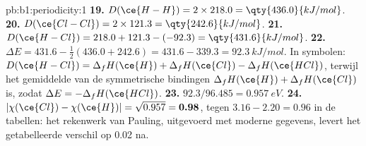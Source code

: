 \begin{solution}{pb:b1:periodicity:1}
\textbf{19.} $D(\ce{H-H}) = 2 \times 218.0 = \qty{436.0}{kJ/mol}$.
\textbf{20.} $D(\ce{Cl-Cl}) = 2 \times 121.3 = \qty{242.6}{kJ/mol}$.
\textbf{21.} $D(\ce{H-Cl}) = 218.0 + 121.3 - (-92.3) = \qty{431.6}{kJ/mol}$.
\textbf{22.} $\Delta E = 431.6 - \tfrac12(436.0 + 242.6) = 431.6 - 339.3 =
\qty{92.3}{kJ/mol}$. In symbolen: $D(\ce{H-Cl}) = \Delta_fH(\ce{H}) +
\Delta_fH(\ce{Cl}) - \Delta_fH(\ce{HCl})$, terwijl het gemiddelde van de
symmetrische bindingen $\Delta_fH(\ce{H}) + \Delta_fH(\ce{Cl})$ is, zodat
$\Delta E =
-\Delta_fH(\ce{HCl})$.
\textbf{23.} $92.3/96.485 = \qty{0.957}{eV}$.
\textbf{24.} $|\chi(\ce{Cl}) - \chi(\ce{H})| = \sqrt{0.957} =
\textbf{0.98}$, tegen $3.16 - 2.20 = 0.96$ in de tabellen: het rekenwerk
van Pauling, uitgevoerd met moderne gegevens, levert het getabelleerde
verschil op 0.02 na.
\end{solution}

